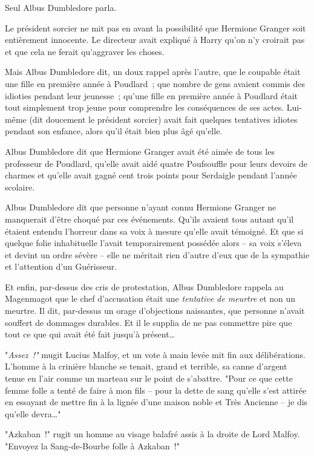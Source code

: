 Seul Albus Dumbledore parla.

Le président sorcier ne mit pas en avant la possibilité que Hermione Granger soit entièrement innocente. Le directeur avait expliqué à Harry qu'on n'y croirait pas et que cela ne ferait qu'aggraver les choses.

Mais Albus Dumbledore dit, un doux rappel après l'autre, que le coupable était une fille en première année à Poudlard~; que nombre de gens avaient commis des idioties pendant leur jeunesse~; qu'une fille en première année à Poudlard était tout simplement trop jeune pour comprendre les conséquences de ses actes. Lui-même (dit doucement le président sorcier) avait fait quelques tentatives idiotes pendant son enfance, alors qu'il était bien plus âgé qu'elle.

Albus Dumbledore dit que Hermione Granger avait été aimée de tous les professeur de Poudlard, qu'elle avait aidé quatre Poufsouffle pour leurs devoirs de charmes et qu'elle avait gagné cent trois points pour Serdaigle pendant l'année scolaire.

Albus Dumbledore dit que personne n'ayant connu Hermione Granger ne manquerait d'être choqué par ces événements. Qu'ils avaient tous autant qu'il étaient entendu l'horreur dans sa voix à mesure qu'elle avait témoigné. Et que si quelque folie inhabituelle l'avait temporairement possédée alors -- sa voix s'éleva et devint un ordre sévère -- elle ne méritait rien d'autre d'eux que de la sympathie et l'attention d'un Guérisseur.

Et enfin, par-dessus des cris de protestation, Albus Dumbledore rappela au Magenmagot que le chef d'accusation était une \emph{tentative de meurtre} et non un meurtre. Il dit, par-dessus un orage d'objections naissantes, que personne n'avait souffert de dommages durables. Et il le supplia de ne pas commettre pire que tout ce que qui avait été fait jusqu'à présent…

"\emph{Assez~!"} mugit Lucius Malfoy, et un vote à main levée mit fin aux délibérations. L'homme à la crinière blanche se tenait, grand et terrible, sa canne d'argent tenue en l'air comme un marteau sur le point de s'abattre. "Pour ce que cette femme folle a tenté de faire à mon fils -- pour la dette de sang qu'elle s'est attirée en essayant de mettre fin à la lignée d'une maison noble et Très Ancienne -- je dis qu'elle devra…"

"Azkaban~!" rugit un homme au visage balafré assis à la droite de Lord Malfoy. "Envoyez la Sang-de-Bourbe folle à Azkaban~!"

